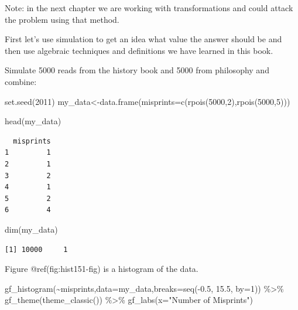 \documentclass[
  letterpaper,
  DIV=11,
  numbers=noendperiod]{scrreprt}
\newenvironment{Shaded}{\begin{snugshade}}{\end{snugshade}}
\newcommand{\AttributeTok}[1]{\textcolor[rgb]{0.40,0.45,0.13}{#1}}
\newcommand{\DecValTok}[1]{\textcolor[rgb]{0.68,0.00,0.00}{#1}}
\newcommand{\FloatTok}[1]{\textcolor[rgb]{0.68,0.00,0.00}{#1}}
\newcommand{\FunctionTok}[1]{\textcolor[rgb]{0.28,0.35,0.67}{#1}}
\newcommand{\NormalTok}[1]{\textcolor[rgb]{0.00,0.23,0.31}{#1}}
\newcommand{\OtherTok}[1]{\textcolor[rgb]{0.00,0.23,0.31}{#1}}
\newcommand{\SpecialCharTok}[1]{\textcolor[rgb]{0.37,0.37,0.37}{#1}}
\newcommand{\StringTok}[1]{\textcolor[rgb]{0.13,0.47,0.30}{#1}}
\begin{document}
Note: in the next chapter we are working with transformations and could
attack the problem using that method.

First let's use simulation to get an idea what value the answer should
be and then use algebraic techniques and definitions we have learned in
this book.

Simulate 5000 reads from the history book and 5000 from philosophy and
combine:

\begin{Shaded}
\begin{Highlighting}[]
\FunctionTok{set.seed}\NormalTok{(}\DecValTok{2011}\NormalTok{)}
\NormalTok{my\_data}\OtherTok{\textless{}{-}}\FunctionTok{data.frame}\NormalTok{(}\AttributeTok{misprints=}\FunctionTok{c}\NormalTok{(}\FunctionTok{rpois}\NormalTok{(}\DecValTok{5000}\NormalTok{,}\DecValTok{2}\NormalTok{),}\FunctionTok{rpois}\NormalTok{(}\DecValTok{5000}\NormalTok{,}\DecValTok{5}\NormalTok{)))}
\end{Highlighting}
\end{Shaded}

\begin{Shaded}
\begin{Highlighting}[]
\FunctionTok{head}\NormalTok{(my\_data)}
\end{Highlighting}
\end{Shaded}

\begin{verbatim}
  misprints
1         1
2         1
3         2
4         1
5         2
6         4
\end{verbatim}

\begin{Shaded}
\begin{Highlighting}[]
\FunctionTok{dim}\NormalTok{(my\_data)}
\end{Highlighting}
\end{Shaded}

\begin{verbatim}
[1] 10000     1
\end{verbatim}

Figure @ref(fig:hist151-fig) is a histogram of the data.

\begin{Shaded}
\begin{Highlighting}[]
\FunctionTok{gf\_histogram}\NormalTok{(}\SpecialCharTok{\textasciitilde{}}\NormalTok{misprints,}\AttributeTok{data=}\NormalTok{my\_data,}\AttributeTok{breaks=}\FunctionTok{seq}\NormalTok{(}\SpecialCharTok{{-}}\FloatTok{0.5}\NormalTok{, }\FloatTok{15.5}\NormalTok{, }\AttributeTok{by=}\DecValTok{1}\NormalTok{)) }\SpecialCharTok{\%\textgreater{}\%}
  \FunctionTok{gf\_theme}\NormalTok{(}\FunctionTok{theme\_classic}\NormalTok{()) }\SpecialCharTok{\%\textgreater{}\%}
  \FunctionTok{gf\_labs}\NormalTok{(}\AttributeTok{x=}\StringTok{"Number of Misprints"}\NormalTok{)}
\end{Highlighting}
\end{Shaded}
\end{document}

